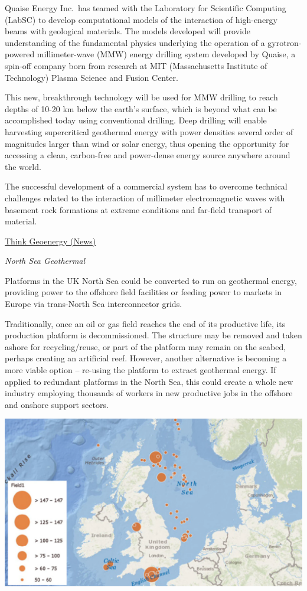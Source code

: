 \documentclass[
]{book}
\begin{document}
Quaise Energy Inc.~has teamed with the Laboratory for Scientific Computing (LabSC) to develop computational models of the interaction of high-energy beams with geological materials.
The models developed will provide understanding of the fundamental physics underlying the operation of a gyrotron-powered millimeter-wave (MMW) energy drilling system developed by Quaise, a spin-off company born from research at MIT (Massachusetts Institute of Technology) Plasma Science and Fusion Center.

This new, breakthrough technology will be used for MMW drilling to reach depths of 10-20 km below the earth's surface, which is beyond what can be accomplished today using conventional drilling.
Deep drilling will enable harvesting supercritical geothermal energy with power densities several order of magnitudes larger than wind or solar energy, thus opening the opportunity for accessing a clean, carbon-free and power-dense energy source anywhere around the world.

The successful development of a commercial system has to overcome technical challenges related to the interaction of millimeter electromagnetic waves with basement rock formations at extreme conditions and far-field transport of material.

\href{https://www.thinkgeoenergy.com/research-partnership-to-explore-ultra-deep-geothermal-drilling/}{Think Geoenergy (News)}

\emph{North Sea Geothermal}

Platforms in the UK North Sea could be converted to run on geothermal energy, providing power to the offshore field facilities or feeding power to markets in Europe via trans-North Sea interconnector grids.

Traditionally, once an oil or gas field reaches the end of its productive life, its production platform is decommissioned. The structure may be removed and taken ashore for recycling/reuse, or part of the platform may remain on the seabed, perhaps creating an artificial reef. However, another alternative is becoming a more viable option -- re-using the platform to extract geothermal energy. If applied to redundant platforms in the North Sea, this could create a whole new industry employing thousands of workers in new productive jobs in the offshore and onshore support sectors.

\includegraphics{fig/North_Sea_UK_geothermal.png}
\end{document}

